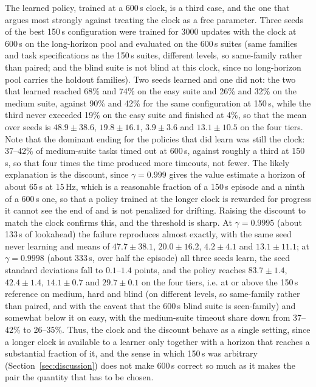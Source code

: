 \documentclass[11pt]{article}
\begin{document}
The learned policy, trained at a 600\,s clock, is a third case, and the one
that argues most strongly against treating the clock as a free parameter.
Three seeds of the best 150\,s configuration were trained for 3000 updates
with the clock at 600\,s on the long-horizon pool and evaluated on the 600\,s
suites (same families and task specifications as the 150\,s suites, different
levels, so same-family rather than paired; and the blind suite is not blind
at this clock, since no long-horizon pool carries the holdout families). Two
seeds learned and one did not: the two that learned reached 68\% and 74\% on
the easy suite and 26\% and 32\% on the medium suite, against 90\% and 42\%
for the same configuration at 150\,s, while the third never exceeded 19\% on
the easy suite and finished at 4\%, so that the mean over seeds is
$48.9 \pm 38.6$, $19.8 \pm 16.1$, $3.9 \pm 3.6$ and $13.1 \pm 10.5$ on the
four tiers. Note that the dominant ending for the policies that did learn
was still the clock: 37--42\% of medium-suite tasks timed out at 600\,s,
against roughly a third at 150\,s, so that four times the time produced
more timeouts, not fewer. The likely explanation is the discount, since
$\gamma = 0.999$ gives the value estimate a horizon of about 65\,s at
15\,Hz, which is a reasonable fraction of a 150\,s episode and a ninth of a
600\,s one, so that a policy trained at the longer clock is rewarded for
progress it cannot see the end of and is not penalized for drifting. Raising the discount to match the clock confirms this, and
the threshold is sharp. At $\gamma = 0.9995$ (about 133\,s of lookahead) the
failure reproduces almost exactly, with the same seed never learning and
means of $47.7 \pm 38.1$, $20.0 \pm 16.2$, $4.2 \pm 4.1$ and $13.1 \pm 11.1$;
at $\gamma = 0.9998$ (about 333\,s, over half the episode) all three seeds
learn, the seed standard deviations fall to $0.1$--$1.4$ points, and the
policy reaches $83.7 \pm 1.4$, $42.4 \pm 1.4$, $14.1 \pm 0.7$ and
$29.7 \pm 0.1$ on the four tiers, i.e. at or above the 150\,s reference on
medium, hard and blind (on different levels, so same-family rather than
paired, and with the caveat that the 600\,s blind suite is seen-family) and
somewhat below it on easy, with the medium-suite timeout share down from
37--42\% to 26--35\%. Thus, the clock and the discount behave as a single
setting, since a longer clock is available to a learner only together with a
horizon that reaches a substantial fraction of it, and the sense in which
150\,s was arbitrary (Section~\ref{sec:discussion}) does not make 600\,s
correct so much as it makes the pair the quantity that has to be chosen.
\end{document}
